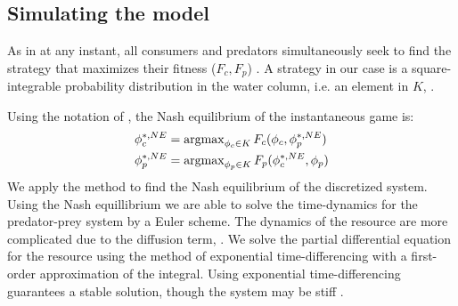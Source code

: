 \subsection{Simulating the model}




As in  at any instant, all consumers and predators simultaneously seek to find the strategy that maximizes their fitness ($F_c, F_p$) . A strategy in our case is a square-integrable probability distribution in the water column, i.e. an element in $K$, .

Using the notation of , the Nash equilibrium of the instantaneous game is:
\begin{equation}
  \label{eq:nash_equilibria}
  \begin{split}
  	\phi_c^{*,NE} &=  \argmax_{\phi_c \in K}  F_c(\phi_c, \phi_p^{*,NE}) \\
  	\phi_p^{*,NE} &=  \argmax_{\phi_p \in K} F_p(\phi_c^{*,NE}, \phi_p)
  \end{split}
\end{equation}
We apply the method  to find the Nash equilibrium of the discretized system. Using the Nash equillibrium  we are able to solve the time-dynamics for the predator-prey system  by a Euler scheme. The dynamics of the resource are more complicated due to the diffusion term, . We solve the partial differential equation for the resource using the method of exponential time-differencing \citep{hochbruck2010exponential} with a first-order approximation of the integral. Using exponential time-differencing guarantees a stable solution, though the system may be stiff \cite{hochbruck2010exponential}.

